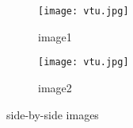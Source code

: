 \documentclass{article}
\begin{document}
\begin{figure}[h]
  \centering
  \begin{subfigure}[b]{0.4\textwidth}
    \texttt{[image: vtu.jpg]}
    \caption{image1}
    \label{fig:image1}
  \end{subfigure}
  \hfill
  \begin{subfigure}[b]{0.4\textwidth}
    \texttt{[image: vtu.jpg]}
    \caption{image2}
    \label{fig:image2}
  \end{subfigure}
  \caption{side-by-side images}
  \label{fig:side_by_side}
\end{figure}
\end{document}
